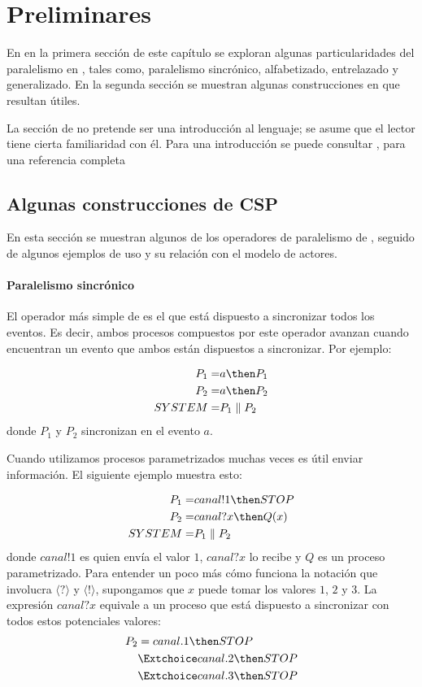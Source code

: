 \chapter{Preliminares}

En en la primera sección de este capítulo se exploran algunas particularidades del paralelismo en \CSP, tales como, paralelismo sincrónico, alfabetizado, entrelazado y generalizado. En la segunda sección se muestran algunas construcciones en \CSPm que resultan útiles. 

La sección de \CSP no pretende ser una introducción al lenguaje; se asume que el lector tiene cierta familiaridad con él. Para una introducción se puede consultar \cite{Cristia:CSP}, para una referencia completa \cite{Roscoe:1997:TPC:550448}

\section{Algunas construcciones de CSP}

En esta sección se muestran algunos de los operadores de paralelismo de \CSP, seguido de algunos ejemplos de uso y su relación con el modelo de actores.  

\subsubsection*{Paralelismo sincrónico}

El operador más simple de \CSP es el que está dispuesto a sincronizar todos los eventos. Es decir, ambos procesos compuestos por este operador avanzan cuando encuentran un evento que ambos están dispuestos a sincronizar. Por ejemplo:

\begin{align*}
P_1 =& a \then P_1\\
P_2 =& a \then P_2 \\
SYSTEM =& P_1 \parallel P_2
\end{align*}
donde $P_1$ y $P_2$ sincronizan en el evento $a$. 

Cuando utilizamos procesos parametrizados muchas veces es útil enviar información. El siguiente ejemplo muestra esto:

\begin{align*}
P_1 =& canal!1 \then STOP \\
P_2 =& canal?x \then Q(x) \\
SYSTEM =& P_1 \parallel P_2 \\
\end{align*}
donde $canal!1$ es quien envía el valor $1$,  $canal?x$ lo recibe y $Q$ es un proceso parametrizado. Para entender un poco más cómo funciona la notación que involucra $\langle ? \rangle$ y $\langle ! \rangle$, supongamos que $x$ puede tomar los valores $1$, $2$ y $3$. La expresión $canal?x$ equivale a un proceso que está dispuesto a sincronizar con todos estos potenciales valores:
\begin{align*}
P_2 & =  canal.1 \then STOP \\
      & \Extchoice canal.2 \then STOP \\
      & \Extchoice canal.3 \then STOP 
\end{align*}

